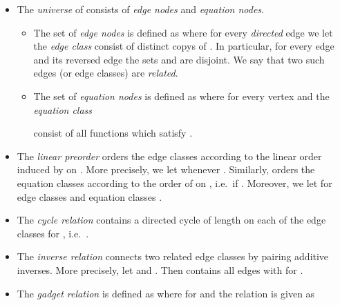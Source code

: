 \documentclass[a4paper,UKenglish]{lipics}
\theoremstyle{plain}
\begin{document}
\begin{itemize}
 \item The \emph{universe} of  consists of \emph{edge 
nodes} and \emph{equation nodes}.
\begin{itemize}
\item The set of \emph{edge nodes}  is defined as  where
 for every \emph{directed} edge  we let
 the \emph{edge class}  consist of  distinct copys of . 
In particular, for every edge  and its reversed 
edge  the sets  and  are 
disjoint. 
We say that two such edges (or edge classes) are \emph{related}. 
\item The set of \emph{equation nodes}  is defined as  where for every 
vertex  and   the \emph{equation class} 
 
consist of all functions  which satisfy .
\end{itemize}


 \item The \emph{linear preorder}  orders the edge 
classes according to the linear order induced by  on . More 
precisely, we let  whenever .
Similarly,  orders the equation classes according to the 
order of  on , i.e.\  if . Moreover, 
we let  for edge classes  and  
equation classes .

 \item The \emph{cycle relation}  contains a directed 
cycle of length  on each of the edge classes  for , i.e.\ .
 \item The \emph{inverse relation}  connects two related edge classes 
by pairing additive inverses. More precisely, let 
 and . Then  contains all 
edges  with  for .

 \item The \emph{gadget relation}   is defined as  where for  and  the relation 
 is given as

\end{itemize}
\end{document}
